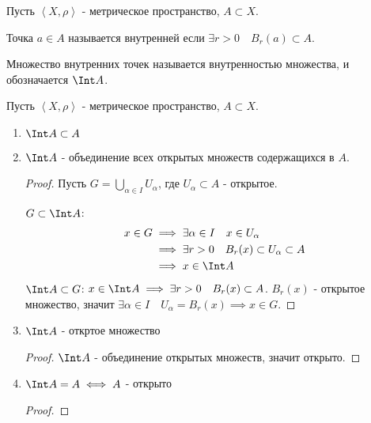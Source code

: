 
\begin{definition}[повтор] \thmslashn 

    Пусть $\left<X, \rho\right>$ - метрическое пространство, $A \subset X$.

    Точка $a\in A$ называется внутренней если $\exists{r > 0}\quad B_{r}(a) \subset A$.

    Множество внутренних точек называется внутренностью множества, и обозначается $\Int A$.
\end{definition}

\begin{properties} \thmslashn

    Пусть $\left<X, \rho\right>$ - метрическое пространство, $A \subset X$.

    \begin{enumerate}
        \item $\Int A \subset A$
        \item $\Int A$ - объединение всех открытых множеств содержащихся в $A$.
            \begin{proof} \thmslashn
            
                Пусть $G = \bigcup\limits_{\alpha\in I} U_{\alpha}$, где $U_{\alpha} \subset A$ - открытое.

                $G \subset \Int A$:
                \begin{equation*}
                    \begin{split}
                        x\in G 
                        &\implies \exists{\alpha\in I}\quad x\in U_{\alpha}\\
                        &\implies \exists{r > 0}\quad B_{r}(x) \subset U_{\alpha} \subset A\\
                        &\implies x\in \Int A
                    \end{split}
                \end{equation*}
                $\Int A \subset G$:  $x\in \Int A \implies \exists{r > 0}\quad B_{r}(x) \subset A$. $B_{r}(x)$ - открытое множество, значит $\exists{\alpha\in I}\quad U_{\alpha} = B_{r}(x) \implies x\in G$.
            \end{proof}
        \item $\Int A$ - откртое множество
            \begin{proof} \thmslashn
            
                $\Int A$ - объединение открытых множеств, значит открыто.
            \end{proof}
        \item $\Int A = A \iff A$ - открыто
            \begin{proof} \thmslashn
            

\end{proof}
\end{enumerate}
\end{properties}
